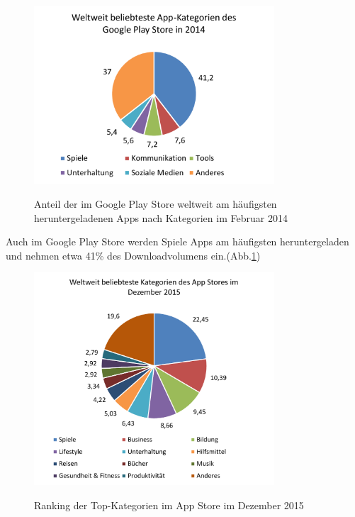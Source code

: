 \begin{figure}[htbp]
	\centering
	\includegraphics[width=0.8\textwidth]{Bilder/Google_Play_Store_Kategorien}
	\caption{Anteil der im Google Play Store weltweit am häufigsten heruntergeladenen Apps nach Kategorien im Februar 2014}\label{graph_play_store_kategorien}\citep{play_store_categories}
\end{figure}

Auch im Google Play Store werden Spiele Apps am häufigsten heruntergeladen und nehmen etwa 41\% des Downloadvolumens ein.(Abb.\ref{graph_play_store_kategorien})

\begin{figure}[htbp]
	\centering
	\includegraphics[width=0.8\textwidth]{Bilder/Top_Kategorien_App_Store}
	\caption{Ranking der Top-Kategorien im App Store im Dezember 2015}\label{graph_app_store_kategorien}\citep{app_store_categories}
\end{figure}

